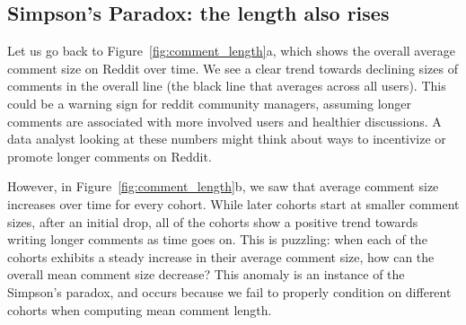 
\subsection{Simpson's Paradox: the length also rises}

Let us go back to Figure~\ref{fig:comment_length}a, which shows the overall average comment size on Reddit over time. We see a clear trend towards declining sizes of comments in the overall line (the black line that averages across all users).
This could be a warning sign for reddit community managers, assuming longer comments are associated with more involved users and healthier discussions. A data analyst looking at these numbers might think about ways to incentivize or promote longer comments on Reddit. 

However, in Figure~\ref{fig:comment_length}b, we saw that average comment size increases over time for every cohort. While later cohorts start at smaller comment sizes, after an initial drop, all of the cohorts show a positive trend towards writing longer comments as time goes on.  This is puzzling: when each of the cohorts exhibits a steady increase in their average comment size, how can the overall mean comment size decrease?  This anomaly is an instance of the Simpson's paradox, and occurs because we fail to properly condition on different cohorts when computing mean comment length. 

